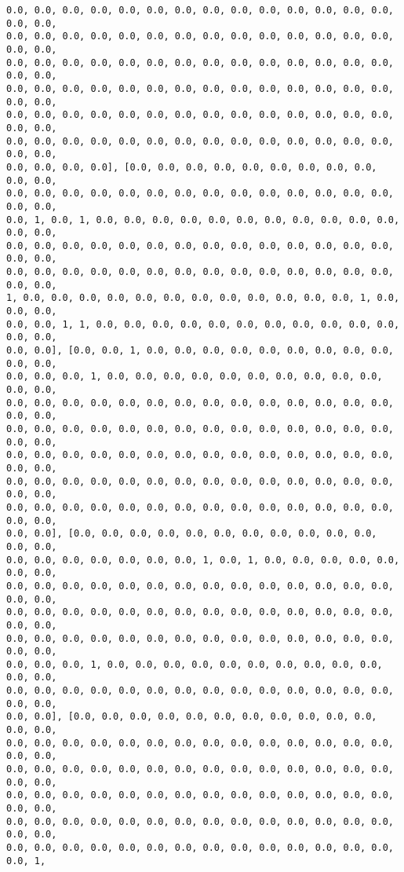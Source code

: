 \documentclass[11pt]{article}
\begin{document}
\begin{Verbatim}[commandchars=\\\{\}]
0.0, 0.0, 0.0, 0.0, 0.0, 0.0, 0.0, 0.0, 0.0, 0.0, 0.0, 0.0, 0.0, 0.0, 0.0, 0.0,
0.0, 0.0, 0.0, 0.0, 0.0, 0.0, 0.0, 0.0, 0.0, 0.0, 0.0, 0.0, 0.0, 0.0, 0.0, 0.0,
0.0, 0.0, 0.0, 0.0, 0.0, 0.0, 0.0, 0.0, 0.0, 0.0, 0.0, 0.0, 0.0, 0.0, 0.0, 0.0,
0.0, 0.0, 0.0, 0.0, 0.0, 0.0, 0.0, 0.0, 0.0, 0.0, 0.0, 0.0, 0.0, 0.0, 0.0, 0.0,
0.0, 0.0, 0.0, 0.0, 0.0, 0.0, 0.0, 0.0, 0.0, 0.0, 0.0, 0.0, 0.0, 0.0, 0.0, 0.0,
0.0, 0.0, 0.0, 0.0, 0.0, 0.0, 0.0, 0.0, 0.0, 0.0, 0.0, 0.0, 0.0, 0.0, 0.0, 0.0,
0.0, 0.0, 0.0, 0.0], [0.0, 0.0, 0.0, 0.0, 0.0, 0.0, 0.0, 0.0, 0.0, 0.0, 0.0,
0.0, 0.0, 0.0, 0.0, 0.0, 0.0, 0.0, 0.0, 0.0, 0.0, 0.0, 0.0, 0.0, 0.0, 0.0, 0.0,
0.0, 1, 0.0, 1, 0.0, 0.0, 0.0, 0.0, 0.0, 0.0, 0.0, 0.0, 0.0, 0.0, 0.0, 0.0, 0.0,
0.0, 0.0, 0.0, 0.0, 0.0, 0.0, 0.0, 0.0, 0.0, 0.0, 0.0, 0.0, 0.0, 0.0, 0.0, 0.0,
0.0, 0.0, 0.0, 0.0, 0.0, 0.0, 0.0, 0.0, 0.0, 0.0, 0.0, 0.0, 0.0, 0.0, 0.0, 0.0,
1, 0.0, 0.0, 0.0, 0.0, 0.0, 0.0, 0.0, 0.0, 0.0, 0.0, 0.0, 0.0, 1, 0.0, 0.0, 0.0,
0.0, 0.0, 1, 1, 0.0, 0.0, 0.0, 0.0, 0.0, 0.0, 0.0, 0.0, 0.0, 0.0, 0.0, 0.0, 0.0,
0.0, 0.0], [0.0, 0.0, 1, 0.0, 0.0, 0.0, 0.0, 0.0, 0.0, 0.0, 0.0, 0.0, 0.0, 0.0,
0.0, 0.0, 0.0, 1, 0.0, 0.0, 0.0, 0.0, 0.0, 0.0, 0.0, 0.0, 0.0, 0.0, 0.0, 0.0,
0.0, 0.0, 0.0, 0.0, 0.0, 0.0, 0.0, 0.0, 0.0, 0.0, 0.0, 0.0, 0.0, 0.0, 0.0, 0.0,
0.0, 0.0, 0.0, 0.0, 0.0, 0.0, 0.0, 0.0, 0.0, 0.0, 0.0, 0.0, 0.0, 0.0, 0.0, 0.0,
0.0, 0.0, 0.0, 0.0, 0.0, 0.0, 0.0, 0.0, 0.0, 0.0, 0.0, 0.0, 0.0, 0.0, 0.0, 0.0,
0.0, 0.0, 0.0, 0.0, 0.0, 0.0, 0.0, 0.0, 0.0, 0.0, 0.0, 0.0, 0.0, 0.0, 0.0, 0.0,
0.0, 0.0, 0.0, 0.0, 0.0, 0.0, 0.0, 0.0, 0.0, 0.0, 0.0, 0.0, 0.0, 0.0, 0.0, 0.0,
0.0, 0.0], [0.0, 0.0, 0.0, 0.0, 0.0, 0.0, 0.0, 0.0, 0.0, 0.0, 0.0, 0.0, 0.0,
0.0, 0.0, 0.0, 0.0, 0.0, 0.0, 0.0, 1, 0.0, 1, 0.0, 0.0, 0.0, 0.0, 0.0, 0.0, 0.0,
0.0, 0.0, 0.0, 0.0, 0.0, 0.0, 0.0, 0.0, 0.0, 0.0, 0.0, 0.0, 0.0, 0.0, 0.0, 0.0,
0.0, 0.0, 0.0, 0.0, 0.0, 0.0, 0.0, 0.0, 0.0, 0.0, 0.0, 0.0, 0.0, 0.0, 0.0, 0.0,
0.0, 0.0, 0.0, 0.0, 0.0, 0.0, 0.0, 0.0, 0.0, 0.0, 0.0, 0.0, 0.0, 0.0, 0.0, 0.0,
0.0, 0.0, 0.0, 1, 0.0, 0.0, 0.0, 0.0, 0.0, 0.0, 0.0, 0.0, 0.0, 0.0, 0.0, 0.0,
0.0, 0.0, 0.0, 0.0, 0.0, 0.0, 0.0, 0.0, 0.0, 0.0, 0.0, 0.0, 0.0, 0.0, 0.0, 0.0,
0.0, 0.0], [0.0, 0.0, 0.0, 0.0, 0.0, 0.0, 0.0, 0.0, 0.0, 0.0, 0.0, 0.0, 0.0,
0.0, 0.0, 0.0, 0.0, 0.0, 0.0, 0.0, 0.0, 0.0, 0.0, 0.0, 0.0, 0.0, 0.0, 0.0, 0.0,
0.0, 0.0, 0.0, 0.0, 0.0, 0.0, 0.0, 0.0, 0.0, 0.0, 0.0, 0.0, 0.0, 0.0, 0.0, 0.0,
0.0, 0.0, 0.0, 0.0, 0.0, 0.0, 0.0, 0.0, 0.0, 0.0, 0.0, 0.0, 0.0, 0.0, 0.0, 0.0,
0.0, 0.0, 0.0, 0.0, 0.0, 0.0, 0.0, 0.0, 0.0, 0.0, 0.0, 0.0, 0.0, 0.0, 0.0, 0.0,
0.0, 0.0, 0.0, 0.0, 0.0, 0.0, 0.0, 0.0, 0.0, 0.0, 0.0, 0.0, 0.0, 0.0, 0.0, 1,

\end{Verbatim}
\end{document}
